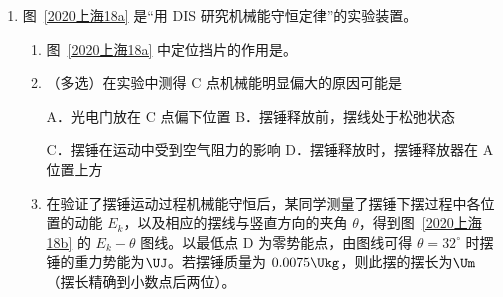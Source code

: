 \documentclass[\gkver]{gaokaozhenti}
\begin{document}
\begin{enumerate}
{（2）由图可得，体积减小为原来一半的时间、即半衰期为 $200\Us$，则 1.5 个“半衰期”为 $300\Us$，从纵坐标可以得出体积约为 $60.1\Ucmc$。

计算题做法应是 $V = V_{0} \cdot \frac{1}{2^{1.5}} = 170 \times \frac{\sqrt{2}}{4}\Ucmc = 60.10\Ucmc$。
}

\item
图~\ref{2020上海18a} 是“用 DIS 研究机械能守恒定律”的实验装置。
\begin{enumerate}
	\item
	图~\ref{2020上海18a} 中定位挡片的作用是。
	\item
	（多选）在实验中测得 C 点机械能明显偏大的原因可能是

	A．光电门放在 C 点偏下位置 \qquad B．摆锤释放前，摆线处于松弛状态

	C．摆锤在运动中受到空气阻力的影响 \qquad D．摆锤释放时，摆锤释放器在 A 位置上方
	\item
	在验证了摆锤运动过程机械能守恒后，某同学测量了摆锤下摆过程中各位置的动能 $E_{k}$，以及相应的摆线与竖直方向的夹角 $\theta$，得到图~\ref{2020上海18b} 的 $E_{k}-\theta$ 图线。以最低点 D 为零势能点，由图线可得 $\theta = 32^{\circ}$ 时摆锤的重力势能为$\UJ$。若摆锤质量为 $0.0075\Ukg$，则此摆的摆长为$\Um$（摆长精确到小数点后两位）。
\end{enumerate}
\twopicture[labelA=2020上海18a, labelB=2020上海18b, align=right, wA=5.37cm, wB=10.11cm]
{}
{}
\end{enumerate}
\end{document}
